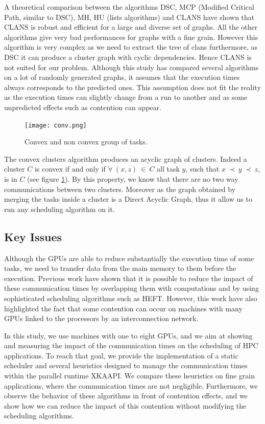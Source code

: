 \documentclass[10pt, conference, compsocconf,pdftex,dvipsnames]{IEEEtran}
\begin{document}
A theoretical comparison\cite{khan1994comparison} between the algorithms DSC,
MCP (Modified Critical Path, similar to DSC), MH, HU (lists algorithms) and
CLANS have shown that CLANS is robust and efficient for a large and diverse
set of graphs. All the other algorithms give very bad performances for graphs
with a fine grain. However this algorithm is very complex as we need to
extract the tree of clans furthermore, as DSC it can produce a cluster graph
with cyclic dependencies. Hence CLANS is not suited for our problem. Although
this study has compared several algorithms on a lot of randomly generated
graphs, it assumes that the execution times always corresponds to the
predicted ones.  This assumption does not fit the reality as the execution
times can slightly change from a run to another and as some unpredicted
effects such as contention can appear. 

\begin{figure}[htb]
    \centering
    \texttt{[image: conv.png]}
    \caption{Convex and non convex group of tasks.}
    \label{fig:conv}
\end{figure}


The convex clusters algorithm\cite{lepere2002new} produces an acyclic graph
of clusters.  Indeed a cluster $C$ is convex if and only if $\forall\ (x,z)\
\in\ C$ all task $y$, such that $x\ \prec\ y\ \prec\ z$, is in $C$ (see
figure \ref{fig:conv}). By this property, we know that there are no two way
communications between two clusters. Moreover as the graph obtained by merging
the tasks inside a cluster is a Direct Acyclic Graph, thus it allow us to run
any scheduling algorithm on it.

\subsection{Key Issues}

Although the GPUs are able to reduce substantially the execution time of some
tasks, we need to transfer data from the main memory to them before the
execution. Previous work\cite{ferreiralima:hal-00735470} have shown that it is
possible to reduce the impact of these communication times by overlapping
them with computations and by using sophisticated scheduling algorithms such as
HEFT.  However, this work have also highlighted the fact that some contention
can occur on machines with many GPUs linked to the processors by an
interconnection network.

In this study, we use machines with one to eight GPUs, and we aim at showing
and measuring the impact of the communication times on the scheduling of HPC
applications. To reach that goal, we provide the implementation of  a static
scheduler and several heuristics designed to manage the communication times 
within the parallel runtime XKAAPI. We compare these heuristics on fine grain
applications, where the communication times are not negligible. Furthermore,
we observe the behavior of these algorithms in front of contention effects, and
we show how we can reduce the impact of this contention without modifying the
scheduling algorithms.
\end{document}
